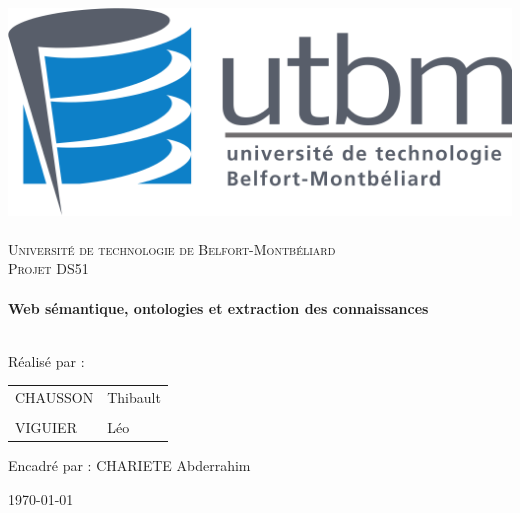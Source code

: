 
\thispagestyle{empty}
    \begin{sffamily}
        \begin{center}


            \includegraphics[scale=0.2]{ressources/logo.png}~\\[1cm]

            \textsc{\LARGE Université de technologie de Belfort-Montbéliard}\\[2cm]

            \textsc{\Large Projet DS51}\\[1cm]

            {\color{UTBMcolor}\HRule} \\[0.4cm]
            { \huge \bfseries Web sémantique, ontologies et extraction des connaissances\\[0.4cm] }
            {\color{UTBMcolor}\HRule} \\[1,5cm]



            \begin{center}
            Réalisé par : 

            \vspace{0,2cm}
            
                \begin{tabular}{ l l }
                    CHAUSSON & Thibault \\
                    &                            \\
                    VIGUIER & Léo \\
                \end{tabular}

                \vspace{0,5cm}
                
                Encadré par : CHARIETE Abderrahim
            \end{center}




            \vfill

            \textsc{\large \today}

        \end{center}
    \end{sffamily}

